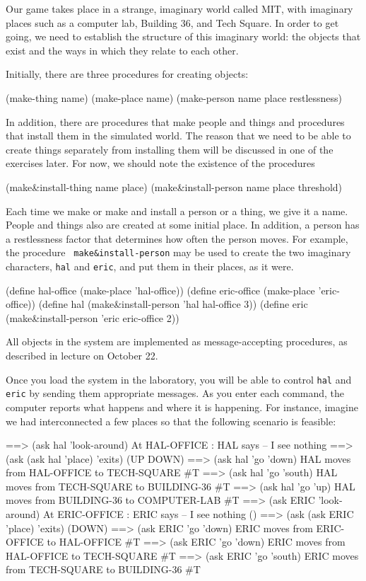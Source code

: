 Our game takes place in a strange, imaginary world called MIT, with
imaginary places such as a computer lab, Building 36, and Tech Square.
In order to get going, we 
need to establish the structure of this imaginary world: the objects
that exist and the ways in which they relate to each other.

Initially, there are three procedures for creating objects:

\beginlisp
  (make-thing name)
  (make-place name)
  (make-person name place restlessness)
\endlisp

In addition, there are procedures that make people and things and
procedures that install them in the simulated world.  The reason that
we need to be able to create things separately from installing them
will be discussed in one of the exercises later.  For now, we should
note the existence of the procedures

\beginlisp
  (make\&install-thing name place)
  (make\&install-person name place threshold)
\endlisp

Each time we make or make and install a person or a thing, we give it
a name.  People and things also are created at some initial place.  In
addition, a person has a restlessness factor that determines how often
the person moves. For example, the procedure {\tt
make\&install-person} may be used to create the two imaginary
characters, {\tt hal} and {\tt eric}, and put them in their places, as
it were.

\beginlisp
  (define  hal-office (make-place  'hal-office))
  (define eric-office (make-place 'eric-office))
\null
  (define  hal (make\&install-person  'hal  hal-office 3))
  (define eric (make\&install-person 'eric eric-office 2))
\endlisp

All objects in the system are implemented as message-accepting
procedures, as described in lecture on October 22.

Once you load the system in the laboratory, you will be able to
control {\tt hal} and {\tt eric} by sending them appropriate messages.
As you enter each command, the computer reports what happens and where
it is happening. For instance, imagine we had interconnected a few
places so that the following scenario is feasible:

\beginlisp
==> (ask hal 'look-around)
At HAL-OFFICE : HAL says -- I see nothing 
==> (ask (ask hal 'place) 'exits)
(UP DOWN)
==> (ask hal 'go 'down)
HAL moves from HAL-OFFICE to TECH-SQUARE 
\#T
==> (ask hal 'go 'south)
HAL moves from TECH-SQUARE to BUILDING-36 
\#T
==> (ask hal 'go 'up)
HAL moves from BUILDING-36 to COMPUTER-LAB 
\#T
==> (ask ERIC 'look-around)
At ERIC-OFFICE : ERIC says -- I see nothing 
()
==> (ask (ask ERIC 'place) 'exits)
(DOWN)
==> (ask ERIC 'go 'down)
ERIC moves from ERIC-OFFICE to HAL-OFFICE
\#T
==> (ask ERIC 'go 'down)
ERIC moves from HAL-OFFICE to TECH-SQUARE
\#T
==> (ask ERIC 'go 'south)
ERIC moves from TECH-SQUARE to BUILDING-36 
\#T
\endlisp

